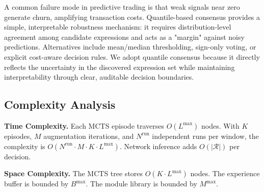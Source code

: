A common failure mode in predictive trading is that weak signals near zero generate churn, amplifying transaction costs. Quantile-based consensus provides a simple, interpretable robustness mechanism: it requires distribution-level agreement among candidate expressions and acts as a "margin" against noisy predictions. Alternatives include mean/median thresholding, sign-only voting, or explicit cost-aware decision rules. We adopt quantile consensus because it directly reflects the uncertainty in the discovered expression set while maintaining interpretability through clear, auditable decision boundaries.

\subsection{Complexity Analysis}
\label{subsec:complexity}

\textbf{Time Complexity.} Each MCTS episode traverses $O(L^{\max})$ nodes. With $K$ episodes, $M$ augmentation iterations, and $N^{\text{run}}$ independent runs per window, the complexity is $O(N^{\text{run}} \cdot M \cdot K \cdot L^{\max})$. Network inference adds $O(|\mathcal{R}|)$ per decision.

\textbf{Space Complexity.} The MCTS tree stores $O(K \cdot L^{\max})$ nodes. The experience buffer is bounded by $B^{\max}$. The module library is bounded by $M^{\max}$.
